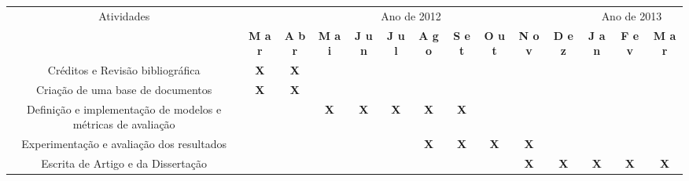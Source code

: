\documentclass[a4paper,12pt]{article}
\begin{document}
\begin{table}[htb]
   \centering
   \small
   \setlength{\arrayrulewidth}{2\arrayrulewidth}  %

   \begin{tabular}{|c|c|c|c|c|c|c|c|c|c|c|c|c|c|}
      \hline
      \multicolumn{ 1}{|c|}{Atividades} & \multicolumn{ 10}{c|}{Ano de 2012} & \multicolumn{ 3}{c|}{Ano de 2013} \\ \cline{ 2 - 14}

      \multicolumn{ 1}{|p{0.1cm}|}{} & \multicolumn{1}{p{0.1cm}|}{\scriptsize{\textbf{M a r}}} & \multicolumn{1}{p{0.1cm}|}{\scriptsize{\textbf{A b r}}} & \multicolumn{1}{p{0.1cm}|}{\scriptsize{\textbf{{M a i}}}} & \multicolumn{1}{p{0.1cm}|}{\scriptsize{\textbf{J u n}}} & \multicolumn{1}{p{0.1cm}|}{\scriptsize{\textbf{J u l}}} & \multicolumn{1}{p{0.1cm}|}{\scriptsize{\textbf{A g o}}} & \multicolumn{1}{p{0.1cm}|}{\scriptsize{\textbf{S e t}}} & \multicolumn{1}{p{0.2cm}|}{\scriptsize{\textbf{O u t}}} & \multicolumn{1}{p{0.1cm}|}{\scriptsize{\textbf{N o v}}} & \multicolumn{1}{p{0.1cm}|}{\scriptsize{\textbf{D e z}}} &  \multicolumn{1}{p{0.1cm}|}{\scriptsize{\textbf{J a n}}} & \multicolumn{1}{p{0.1cm}|}{\scriptsize{\textbf{F e v}}} & \multicolumn{1}{p{0.1cm}|}{\scriptsize{\textbf{M a r}}} \\ \hline \hline
      \multicolumn{1}{|p{4.0cm}|}{Créditos e Revisão bibliográfica} & \textbf{X} & \textbf{X} &  &  &  &  &  &  &  & \multicolumn{1}{l|}{} & \multicolumn{1}{l|}{} & & \\ \hline
      \multicolumn{1}{|p{4.0cm}|}{Criação de uma base de documentos} & \textbf{X} & \textbf{X} &  &  &  &  &  &  &  & \multicolumn{1}{l|}{} & \multicolumn{1}{l|}{} & & \\ \hline
      \multicolumn{1}{|p{4.0cm}|}{Definição e implementação de modelos e métricas de avaliação} &  &   & \textbf{X} & \textbf{X}  & \textbf{X}  & \textbf{X}  & \textbf{X} &  &  &  &  &  & \\ \hline
      \multicolumn{1}{|p{4.0cm}|}{Experimentação e avaliação dos resultados} &   &   & &  &  & \textbf{X} & \textbf{X} & \textbf{X} & \textbf{X} &  &   &  & \\ \hline
      \multicolumn{1}{|p{4.0cm}|}{Escrita de Artigo e da Dissertação} &  &  &  &  &  &  &   &   & \textbf{X}  & \textbf{X} & \textbf{X} & \textbf{X} & \textbf{X} \\ \hline
   \end{tabular}


\end{table}


\begin{small}

\end{small}
\end{document}
